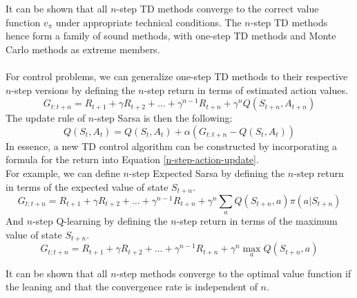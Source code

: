 It can be shown that all $n$-step TD methods converge to the correct value function $v_{\pi}$ under appropriate technical conditions. The $n$-step TD methods hence form a family of sound methods, with one-step TD methods and Monte Carlo methods as extreme members.\\\\
For control problems, we can generalize one-step TD methods to their respective $n$-step versions by defining the $n$-step return in terms of estimated action values.
\begin{equation}
    G_{t:t+n} = R_{t+1} + \gamma R_{t+2} + \dots + \gamma^{n-1} R_{t+n} + \gamma^n Q(S_{t+n}, A_{t+n})
    \label{n-step-return-Sarsa}
\end{equation}
The update rule of $n$-step Sarsa is then the following:
\begin{equation}
    Q(S_t, A_t) = Q(S_t, A_t) + \alpha (G_{t:t+n} - Q(S_t, A_t))
    \label{n-step-action-update}
\end{equation}
In essence, a new TD control algorithm can be constructed by incorporating a formula for the return into Equation \eqref{n-step-action-update}.\\
For example, we can define $n$-step Expected Sarsa by defining the $n$-step return in terms of the expected value of state $S_{t+n}$.
\begin{equation}
    G_{t:t+n} = R_{t+1} + \gamma R_{t+2} + \dots + \gamma^{n-1} R_{t+n} + \gamma^n \sum_a{Q(S_{t+n}, a) \pi(a | S_{t+n})}
    \label{n-step-return-expected-Sarsa}
\end{equation}
And $n$-step Q-learning by defining the $n$-step return in terms of the maximum value of state $S_{t+n}$.
\begin{equation}
    G_{t:t+n} = R_{t+1} + \gamma R_{t+2} + \dots + \gamma^{n-1} R_{t+n} + \gamma^n \max_a{Q(S_{t+n}, a)}
    \label{n-step-return-Q-learning}
\end{equation}

It can be shown that all $n$-step methods converge to the optimal value function if the leaning  and that the convergence rate is independent of $n$.

